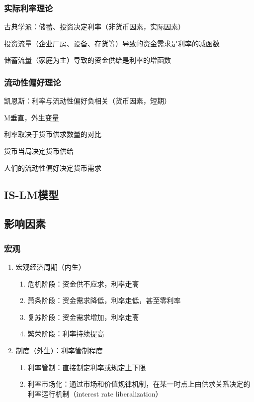 \documentclass[12pt]{book}
\begin{document}
\subsubsection{实际利率理论}

古典学派：储蓄、投资决定利率（非货币因素，实际因素）

\par 投资流量（企业厂房、设备、存货等）导致的资金需求是利率的减函数
\par 储蓄流量（家庭为主）导致的资金供给是利率的增函数

\subsubsection{流动性偏好理论}

凯恩斯：利率与流动性偏好负相关（货币因素，短期）

M垂直，外生变量
\par 利率取决于货币供求数量的对比
\par 货币当局决定货币供给
\par 人们的流动性偏好决定货币需求


\subsection{IS-LM模型}

\subsection{影响因素}

\subsubsection{宏观}

\begin{enumerate}[1.]
    \item 宏观经济周期（内生）
          \begin{enumerate}[(1)]
              \item 危机阶段：资金供不应求，利率走高
              \item 萧条阶段：资金需求降低，利率走低，甚至零利率
              \item 复苏阶段：资金需求增加，利率走高
              \item 繁荣阶段：利率持续提高
          \end{enumerate}
    \item 制度（外生）：利率管制程度
          \begin{enumerate}[(1)]
              \item 利率管制：直接制定利率或规定上下限
              \item 利率市场化：通过市场和价值规律机制，在某一时点上由供求关系决定的利率运行机制（interest rate liberalization）
          \end{enumerate}
\end{enumerate}
\end{document}
